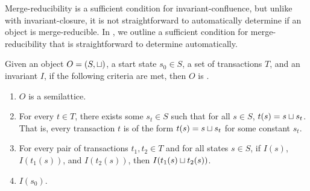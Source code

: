 Merge-reducibility is a sufficient condition for invariant-confluence, but
unlike with invariant-closure, it is not straightforward to automatically
determine if an object is merge-reducible. In , we
outline a sufficient condition for merge-reducibility that is straightforward
to determine automatically.

\begin{theorem}
  Given an object $O = (S, \sqcup)$, a start state $s_0 \in S$, a set of
  transactions $T$, and an invariant $I$, if the following criteria are met,
  then $O$ is \sTIconfluent{}.
  \begin{enumerate}
    \item
      $O$ is a semilattice.

    \item
      For every $t \in T$, there exists some $s_t \in S$ such that for all $s
      \in S$, $t(s) = s \sqcup s_t$. That is, every transaction $t$ is of the
      form $t(s) = s \sqcup s_t$ for some constant $s_t$.

    \item
      For every pair of transactions $t_1, t_2 \in T$ and for all states $s \in
      S$, if $I(s)$, $I(t_1(s))$, and $I(t_2(s))$, then $I(t_1(s) \sqcup
      t_2(s))$.

    \item
      $I(s_0)$.
  \end{enumerate}
\end{theorem}

